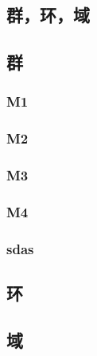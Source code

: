 \begin{center}\section{ 群，环，域}\end{center}
\subsection{群}
\subsubsection{M1}
\subsubsection{M2}
\subsubsection{M3}
\subsubsection{M4}
\subsubsection{sdas}
\subsection{环}
\subsection{域}
